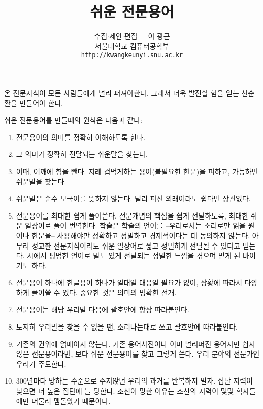 \documentclass[11pt]{book}
\title{쉬운 전문용어}
\author{수집\(\cdot\)제안\(\cdot\)편집\ \ \  이 광근\\
  서울대학교 컴퓨터공학부\\
  \texttt{http://kwangkeunyi.snu.ac.kr}
}
\date{}
\begin{document}
\maketitle

온 전문지식이 모든 사람들에게 널리 퍼져야한다. 그래서 더욱 발전할 힘을 얻는
선순환을 만들어야 한다. 

쉬운 전문용어를 만들때의 원칙은 다음과 같다:
\begin{enumerate}
\item 전문용어의 의미를 정확히 이해하도록 한다.
\item 그 의미가 정확히 전달되는 쉬운말을 찾는다.
\item 이때, 어깨에 힘을 뺀다. 지레 겁먹게하는 용어(불필요한 한문)을 피하고, 가능하면
  쉬운말을 찾는다. 
\item 쉬운말은 순수 모국어를 뜻하지 않는다. 널리 퍼진 외래어라도 쉽다면 상관없다. 
\item 전문용어를 최대한 쉽게 풀어쓴다. 전문개념의 핵심을 쉽게
  전달하도록, 최대한 쉬운 일상어로 풀어 번역한다. 학술은 학술의 언어를
  --우리로서는 소리로만 읽을 원어나 한문을-- 사용해야만 정확하고
  정밀하고 경제적이다는 데 동의하지 않는다. 아무리 정교한 전문지식이라도 쉬운
  일상어로 짧고 정밀하게 전달될 수 있다고 믿는다. 시에서 평범한 언어로
  밀도 있게 전달되는 정밀한 느낌을 겪으며 믿게 된 바이기도 하다. 
\item 전문용어 하나에 한글용어 하나가 일대일 대응일 필요가 없이,
  상황에 따라서 다양하게 풀어쓸 수 있다. 중요한 것은 의미의 명확한
  전개.
\item 전문용어는 해당 우리말 다음에 괄호안에 항상 따라붙인다.
\item 도저히 우리말을 찾을 수 없을 땐, 소리나는대로 쓰고 괄호안에
  따라붙인다. 
\item 기존의 권위에 얽매이지 않는다. 기존 용어사전이나 이미 널리퍼진
  용어지만 쉽지않은 전문용어라면, 보다 쉬운 전문용어를 찾고 그렇게
  쓴다. 우리 분야의 전문가인 우리가 주도한다.
\item 300년마다 망하는 수준으로 주저앉던 우리의
과거를 반복하지 말자. 집단 지력이 낮으면 더 높은 집단에 늘
당한다. 조선이 망한 이유는 조선의 지력이 몇몇 학자들에만
머물러 맴돌았기 때문이다. 

\end{enumerate}



\printindex
\end{document}
